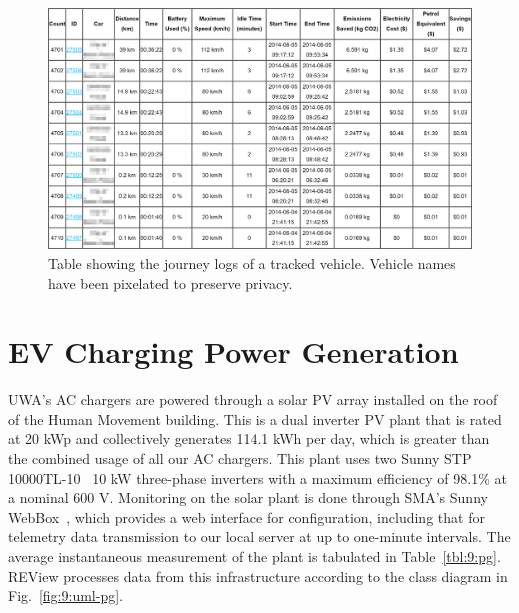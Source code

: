 \begin{figure}[H]
	\centering
	\includegraphics[width=\linewidth]{vt-t-vis-j-crop}
	\caption[Journey logs of a tracked vehicle]{Table showing the journey logs of a tracked vehicle. Vehicle names have been pixelated to preserve privacy.}
	\label{fig:9:vt-t-vis-j}
\end{figure}

\section{EV Charging Power Generation}
\label{sec:9:evpg}
UWA's AC chargers are powered through a solar PV array installed on the roof of the Human Movement building. This is a dual inverter PV plant that is rated at 20 kWp and collectively generates 114.1 kWh per day, which is greater than the combined usage of all our AC chargers. This plant uses two Sunny STP 10000TL-10~\cite{sma_solar_technology_ag_sunny_2017} 10 kW three-phase inverters with a maximum efficiency of 98.1\% at a nominal 600 V. Monitoring on the solar plant is done through SMA's Sunny WebBox~\cite{sma_solar_technology_ag_sunny_nodate}, which provides a web interface for configuration, including that for telemetry data transmission to our local server at up to one-minute intervals. The average instantaneous measurement of the plant is tabulated in Table~\ref{tbl:9:pg}. REView processes data from this infrastructure according to the class diagram in Fig.~\ref{fig:9:uml-pg}.

